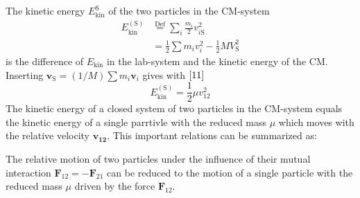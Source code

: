 \documentclass[12pt]{book}
\theoremstyle{definition}\newtheorem{dfn}{Définition}[chapter]
\theoremstyle{plain}\newtheorem{thm}{Théorème}[chapter]
\theoremstyle{plain}\newtheorem{prp}{Proposition}[chapter]
\theoremstyle{plain}\newtheorem{lem}{\bf Lemme}[chapter]
\theoremstyle{plain}\newtheorem{axm}{\bf Axiome}[chapter]
\theoremstyle{plain}\newtheorem{lmm}{\bf Lemme}[chapter]
\theoremstyle{plain}\newtheorem{cor}{\bf Corollaire}[chapter]
\theoremstyle{remark}\newtheorem{rem}{Remarque}[chapter]
\begin{document}
The kinetic energy $E_{\mathrm{kin}}^{\mathrm{S}}$ of the two particles in the CM-system
\begin{equation}
\begin{aligned}
E_{\mathrm{kin}}^{(\mathrm{S})} &\overset{\mathrm{Def}}{=}\sum_{i} \frac{m_{i}}{2} v_{i\mathrm{S}}^{2} \\
&=\frac{1}{2} \sum m_{i} v_{i}^{2}-\frac{1}{2} M V_{\mathrm{S}}^{2}
\end{aligned}
\end{equation}
is the difference of $E_{\mathrm{kin}}$ in the lab-system and the kinetic energy of the CM.
Inserting $\boldsymbol{v}_{\mathrm{S}}=(1 / M) \sum m_{i} \boldsymbol{v}_{i}$ gives with $\ref{11}$
\begin{equation}
E_{\mathrm{kin}}^{(\mathrm{S})}=\frac{1}{2} \mu v_{12}^{2}
\end{equation}
The kinetic energy of a closed system of two particles in the CM-system equals the kinetic energy of a single parrtivle with the reduced mass $\mu$ which moves with the relative velocity $\boldsymbol{v_{12}}$.
This important relations can be summarized as:

The relative motion of two particles under the influence of their mutual interaction $\boldsymbol{F}_{12}=-\boldsymbol{F}_{21}$ can be reduced to the motion of a single particle with the reduced mass $\mu$ driven by the force $\boldsymbol{F}_{12}$.
\end{document}
